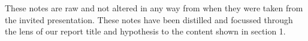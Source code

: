 
{}
 \label{Notes}
These notes are raw and not altered in any way from when they were taken from the invited presentation. These notes have been distilled and focussed through the lens of our report title and hypothesis to the content shown in section 1.

 
\lipsum[1]

\lipsum[2]


\lipsum[3] 


